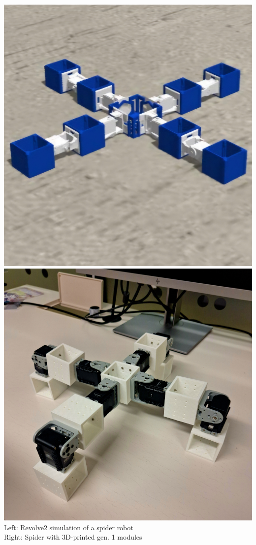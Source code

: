 \documentclass[12pt,a3paper]{article}
\begin{document}
{\begin{center}
       \vspace{2em} %

       \includegraphics[width=0.47\linewidth]{images/image4a.jpg}
       \hspace{0.03\linewidth} %
       \includegraphics[width=0.47\linewidth]{images/2.png}
       \\
       \small Left: Revolve2 simulation of a spider robot
       \\ Right: Spider with 3D-printed gen. 1 modules

       \vspace{2em} %


\end{center}}
\end{document}
